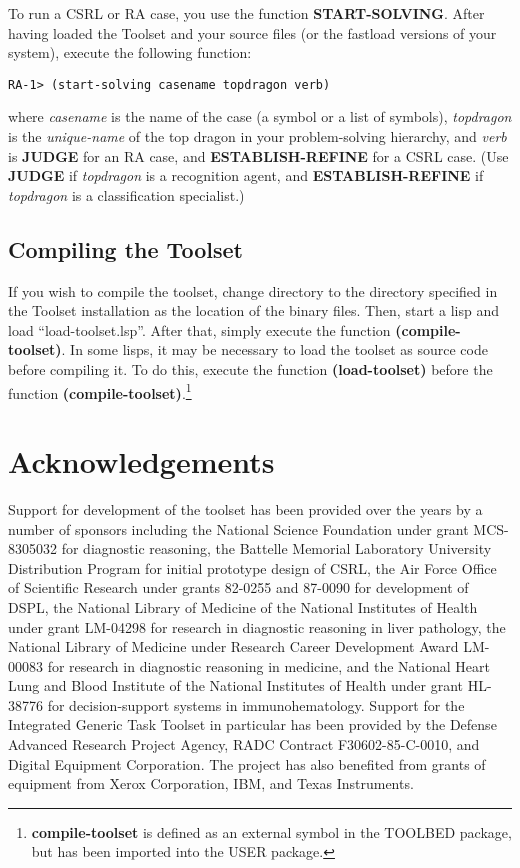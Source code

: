 To run a CSRL or RA case, you use the function {\bf START-SOLVING}. After
having loaded the Toolset and your source files (or the fastload
versions of your system), execute the following function:

\begin{verbatim}
RA-1> (start-solving casename topdragon verb)
\end{verbatim}

where {\it casename} is the name of the case (a symbol or a list of
symbols), {\it topdragon} is the {\it unique-name} of the top dragon
in your problem-solving hierarchy, and {\it verb} is {\bf JUDGE} for
an RA case, and {\bf ESTABLISH-REFINE} for a CSRL case. (Use {\bf
JUDGE} if {\it topdragon} is a recognition agent, and {\bf
ESTABLISH-REFINE} if {\it topdragon} is a classification specialist.)

\section{Compiling the Toolset}

If you wish to compile the toolset, change directory to the directory
specified in the Toolset installation as the location of the binary
files. Then, start a lisp and load ``load-toolset.lsp''. After that,
simply execute the function {\bf (compile-toolset)}. In some lisps, it
may be necessary to load the toolset as source code before compiling
it. To do this, execute the function {\bf (load-toolset)} before the
function {\bf (compile-toolset)}.\footnote{{\bf compile-toolset} is
defined as an external symbol in the TOOLBED package, but has been
imported into the USER package.}



\chapter{Acknowledgements}

Support for development of the toolset has been provided over the years
by a number of sponsors including the National Science Foundation
under grant MCS-8305032 for diagnostic reasoning,
the Battelle Memorial Laboratory University Distribution Program
for initial prototype design of CSRL, the Air Force Office of
Scientific Research under grants 82-0255 and 87-0090 for development
of DSPL, the National Library of Medicine of the National Institutes
of Health under grant LM-04298 for research in diagnostic reasoning in
liver pathology, the National Library of Medicine under Research Career
Development Award LM-00083 for research in diagnostic reasoning in
medicine,  and the National Heart Lung and Blood Institute of the
National Institutes of Health under grant HL-38776 for decision-support
systems in immunohematology.  Support for the Integrated Generic Task
Toolset in particular has been provided by
the Defense Advanced Research Project Agency, RADC Contract
F30602-85-C-0010, and Digital Equipment Corporation.
The project has also benefited from grants of equipment from Xerox
Corporation, IBM, and Texas Instruments.


